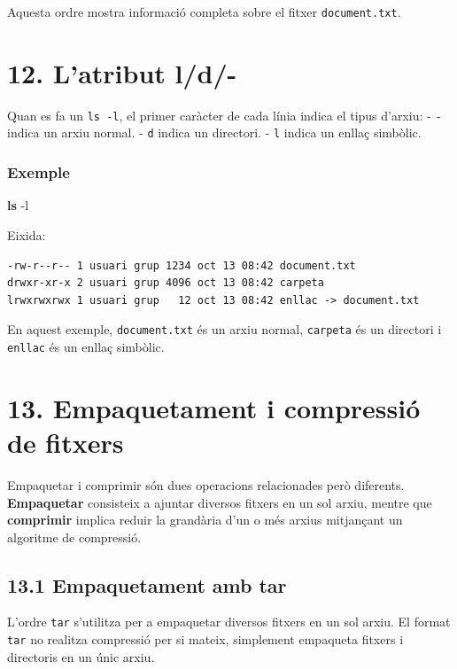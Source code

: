 \documentclass[
  12 pt,
  a4paper,
]{article}
\newenvironment{Shaded}{\begin{snugshade}}{\end{snugshade}}
\newcommand{\AttributeTok}[1]{\textcolor[rgb]{0.13,0.29,0.53}{#1}}
\newcommand{\FunctionTok}[1]{\textcolor[rgb]{0.13,0.29,0.53}{\textbf{#1}}}
\begin{document}
Aquesta ordre mostra informació completa sobre el fitxer
\texttt{document.txt}.

\section{12. L'atribut l/d/-}\label{latribut-ld-}

Quan es fa un \texttt{ls\ -l}, el primer caràcter de cada línia indica
el tipus d'arxiu: - \texttt{-} indica un arxiu normal. - \texttt{d}
indica un directori. - \texttt{l} indica un enllaç simbòlic.

\subsubsection{Exemple}\label{exemple-5}

\begin{Shaded}
\begin{Highlighting}[]
\FunctionTok{ls} \AttributeTok{{-}l}
\end{Highlighting}
\end{Shaded}

Eixida:

\begin{verbatim}
-rw-r--r-- 1 usuari grup 1234 oct 13 08:42 document.txt
drwxr-xr-x 2 usuari grup 4096 oct 13 08:42 carpeta
lrwxrwxrwx 1 usuari grup   12 oct 13 08:42 enllac -> document.txt
\end{verbatim}

En aquest exemple, \texttt{document.txt} és un arxiu normal,
\texttt{carpeta} és un directori i \texttt{enllac} és un enllaç
simbòlic.

\section{13. Empaquetament i compressió de
fitxers}\label{empaquetament-i-compressiuxf3-de-fitxers}

Empaquetar i comprimir són dues operacions relacionades però diferents.
\textbf{Empaquetar} consisteix a ajuntar diversos fitxers en un sol
arxiu, mentre que \textbf{comprimir} implica reduir la grandària d'un o
més arxius mitjançant un algoritme de compressió.

\subsection{13.1 Empaquetament amb tar}\label{empaquetament-amb-tar}

L'ordre \texttt{tar} s'utilitza per a empaquetar diversos fitxers en un
sol arxiu. El format \texttt{tar} no realitza compressió per si mateix,
simplement empaqueta fitxers i directoris en un únic arxiu.
\end{document}
